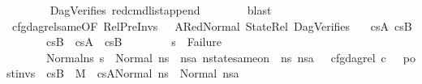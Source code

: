 \begin{isabellebody}
\ \ \ \ \ \ \isamarkupfalse%
\ DagVerifies\ red{\isacharunderscore}{\kern0pt}cmd{\isacharunderscore}{\kern0pt}list{\isacharunderscore}{\kern0pt}append\isanewline
\ \ \ \ \ \ \isamarkupfalse%
\ blast\isanewline
\ \ \ \ \isanewline
\ \ \ \ \isamarkupfalse%
\ cfg{\isacharunderscore}{\kern0pt}dag{\isacharunderscore}{\kern0pt}rel{\isacharunderscore}{\kern0pt}same{\isacharbrackleft}{\kern0pt}OF\ RelPreInvs\ {\isacharunderscore}{\kern0pt}\ {\isacharunderscore}{\kern0pt}\ A{}Red{}Normal\ StateRel{}\ DagVerifies{}{\isacharbrackright}{\kern0pt}\ \ \isamarkupfalse%
\ cs{}A{\isacharprime}{\kern0pt}{\isacharprime}{\kern0pt}\ cs{}B{\isacharprime}{\kern0pt}{\isacharprime}{\kern0pt}\isanewline
\ \ \ \ \ \ \ {\isachardoublequoteopen}cs{}B{\isacharprime}{\kern0pt}\ {\isacharequal}{\kern0pt}\ cs{}A{\isacharprime}{\kern0pt}{\isacharprime}{\kern0pt}\ {\isacharat}{\kern0pt}\ cs{}B{\isacharprime}{\kern0pt}{\isacharprime}{\kern0pt}{\isachardoublequoteclose}\ \isanewline
\ \ \ \ \ \ \ {\isachardoublequoteopen}s{\isacharprime}{\kern0pt}\ {\isasymnoteq}\ Failure{\isachardoublequoteclose}\ \isanewline
\ \ \ \ \ \ \ Normal{}{\isacharcolon}{\kern0pt}{\isachardoublequoteopen}{\isacharparenleft}{\kern0pt}{\isasymforall}ns{}{\isacharprime}{\kern0pt}{\isachardot}{\kern0pt}\ s{\isacharprime}{\kern0pt}\ {\isacharequal}{\kern0pt}\ Normal\ ns{}{\isacharprime}{\kern0pt}\ {\isasymlongrightarrow}\ {\isacharparenleft}{\kern0pt}{\isasymexists}ns{}{\isacharprime}{\kern0pt}a{\isachardot}{\kern0pt}\ nstate{\isacharunderscore}{\kern0pt}same{\isacharunderscore}{\kern0pt}on\ {\isasymLambda}\ ns{}{\isacharprime}{\kern0pt}\ ns{}{\isacharprime}{\kern0pt}a\ {\isacharbraceleft}{\kern0pt}{\isacharbraceright}{\kern0pt}\ {\isasymand}\ cfg{\isacharunderscore}{\kern0pt}dag{\isacharunderscore}{\kern0pt}rel\ c\ {\isacharbrackleft}{\kern0pt}{\isacharbrackright}{\kern0pt}\ {\isacharbrackleft}{\kern0pt}{\isacharbrackright}{\kern0pt}\ post{\isacharunderscore}{\kern0pt}invs\ {\isacharbrackleft}{\kern0pt}{\isacharbrackright}{\kern0pt}\ cs{}B{\isacharprime}{\kern0pt}{\isacharprime}{\kern0pt}\ {\isasymand}\ M{\isacharcomma}{\kern0pt}{\isasymLambda}{\isacharcomma}{\kern0pt}{\isasymGamma}{\isacharcomma}{\kern0pt}{\isasymOmega}\ {\isasymturnstile}\ {\isasymlangle}cs{}A{\isacharprime}{\kern0pt}{\isacharprime}{\kern0pt}{\isacharcomma}{\kern0pt}Normal\ ns{}{\isacharprime}{\kern0pt}{\isasymrangle}\ {\isacharbrackleft}{\kern0pt}{\isasymrightarrow}{\isacharbrackright}{\kern0pt}\ Normal\ ns{}{\isacharprime}{\kern0pt}a{\isacharparenright}{\kern0pt}{\isacharparenright}{\kern0pt}{\isachardoublequoteclose}\isanewline

\end{isabellebody}
